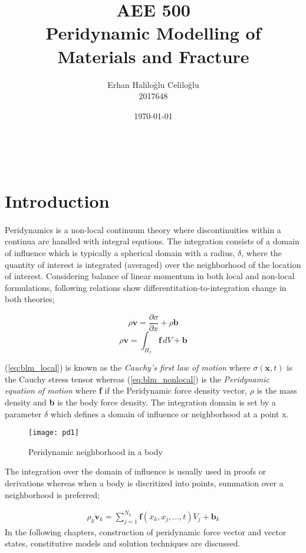 \documentclass[10pt,a4paper,onecolumn]{article}
\title{AEE 500 \\ Peridynamic Modelling of Materials and Fracture}
\author{Erhan Haliloğlu Celiloğlu\\2017648}
\date{\today}
\begin{document}
\maketitle\
\section{Introduction}
\paragraph{}
Peridynamics is a non-local continuum theory where discontinuities within a continua are handled with integral equtions. The integration consists of a domain of influence which is typically a spherical domain with a radius, $\delta$, where the quantity of interest is integrated (averaged) over the neighborhood of the location of interest. 
Considering balance of linear momentum in both local and non-local formulations, following relations show differentitation-to-integration change in both theories;

\begin{equation}
\label{eq:blm_local}
\rho \dot{\mathbf{v}}=\frac{\partial\sigma}{\partial x}+\rho\mathbf{b}
\end{equation}
\begin{equation}
\label{eq:blm_nonlocal}
\rho \dot{\textbf{v}}=\int_{H_x}\textbf{f}\,dV + \textbf{b}
\end{equation}

(\ref{eq:blm_local}) is known as the \textit{Cauchy's first law of motion} where $\sigma(\textbf{x},t)$
 is the Cauchy stress tensor whereas (\ref{eq:blm_nonlocal}) is the \textit{Peridynamic equation of motion} where \textbf{f} if the Peridynamic force density vector, $\rho$ is the mass density and \textbf{b} is the body force density. The integration domain is set by a parameter $\delta$ which defines a domain of influence or neighborhood at a point x.\\

\begin{figure}[h]
\centering
\caption{Peridynamic neighborhood in a body}
\texttt{[image: pd1]}
\end{figure}
The integration over the domain of influence is usually used in proofs or derivations whereas when a body is discritized into points, summation over a neighborhood is preferred; 

\begin{align}
\rho_{k}\dot{\textbf{v}}_k = \sum_{j=1}^{N_k}\textbf{f}(x_k,x_j,...,t)V_j + \textbf{b}_k
\end{align}
In the following chapters, construction of peridynamic force vector and vector states, constitutive models and solution techniques are discussed. 
\end{document}
